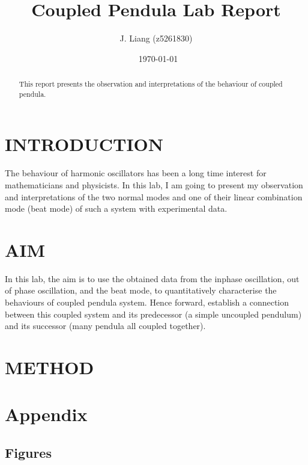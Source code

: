 \documentclass[aps,prl,reprint,10pt,amsmath,amssymb,superscriptaddress,a4paper]{revtex4-2}
\begin{document}
\title{Coupled Pendula Lab Report}
\author{J. Liang (z5261830)}
\date{\currenttime~\today}
\begin{abstract}
    This report presents the observation and interpretations of the behaviour of coupled pendula.
\end{abstract}

\maketitle
\section{INTRODUCTION}
The behaviour of harmonic oscillators has been a long time interest for mathematicians and physicists. In this lab, I am going to present my observation and interpretations of the two normal modes and one of their linear combination mode (beat mode) of such a system with experimental data.

\section{AIM}
In this lab, the aim is to use the obtained data from the inphase oscillation, out of phase oscillation, and the beat mode, to quantitatively characterise the behaviours of coupled pendula system. Hence forward, establish a connection between this coupled system and its predecessor (a simple uncoupled pendulum) and its successor (many pendula all coupled together).

\section{METHOD}







































\onecolumngrid
\newpage
\appendix
\section{Appendix}
\subsection{Figures}
\end{document}

